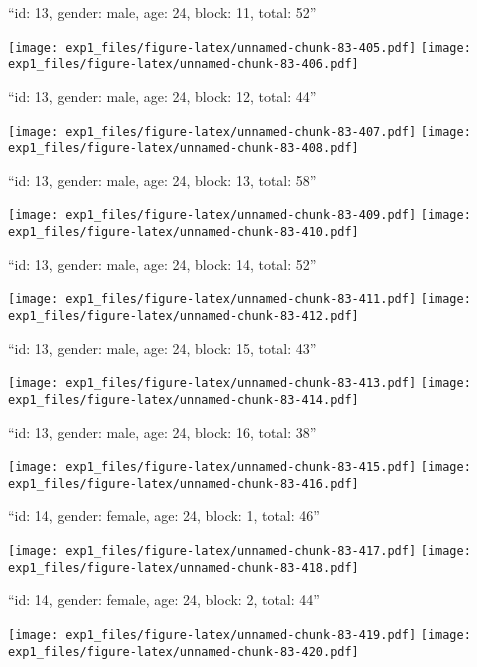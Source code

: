 \documentclass[11pt,,]{article}
\begin{document}
\newpage
[1] 

``id: 13, gender: male, age: 24, block: 11, total: 52''

\texttt{[image: exp1\_files/figure-latex/unnamed-chunk-83-405.pdf]}
\texttt{[image: exp1\_files/figure-latex/unnamed-chunk-83-406.pdf]}

\newpage
[1] 

``id: 13, gender: male, age: 24, block: 12, total: 44''

\texttt{[image: exp1\_files/figure-latex/unnamed-chunk-83-407.pdf]}
\texttt{[image: exp1\_files/figure-latex/unnamed-chunk-83-408.pdf]}

\newpage
[1] 

``id: 13, gender: male, age: 24, block: 13, total: 58''

\texttt{[image: exp1\_files/figure-latex/unnamed-chunk-83-409.pdf]}
\texttt{[image: exp1\_files/figure-latex/unnamed-chunk-83-410.pdf]}

\newpage
[1] 

``id: 13, gender: male, age: 24, block: 14, total: 52''

\texttt{[image: exp1\_files/figure-latex/unnamed-chunk-83-411.pdf]}
\texttt{[image: exp1\_files/figure-latex/unnamed-chunk-83-412.pdf]}

\newpage
[1] 

``id: 13, gender: male, age: 24, block: 15, total: 43''

\texttt{[image: exp1\_files/figure-latex/unnamed-chunk-83-413.pdf]}
\texttt{[image: exp1\_files/figure-latex/unnamed-chunk-83-414.pdf]}

\newpage
[1] 

``id: 13, gender: male, age: 24, block: 16, total: 38''

\texttt{[image: exp1\_files/figure-latex/unnamed-chunk-83-415.pdf]}
\texttt{[image: exp1\_files/figure-latex/unnamed-chunk-83-416.pdf]}

\newpage
[1] 

``id: 14, gender: female, age: 24, block: 1, total: 46''

\texttt{[image: exp1\_files/figure-latex/unnamed-chunk-83-417.pdf]}
\texttt{[image: exp1\_files/figure-latex/unnamed-chunk-83-418.pdf]}

\newpage
[1] 

``id: 14, gender: female, age: 24, block: 2, total: 44''

\texttt{[image: exp1\_files/figure-latex/unnamed-chunk-83-419.pdf]}
\texttt{[image: exp1\_files/figure-latex/unnamed-chunk-83-420.pdf]}
\end{document}
